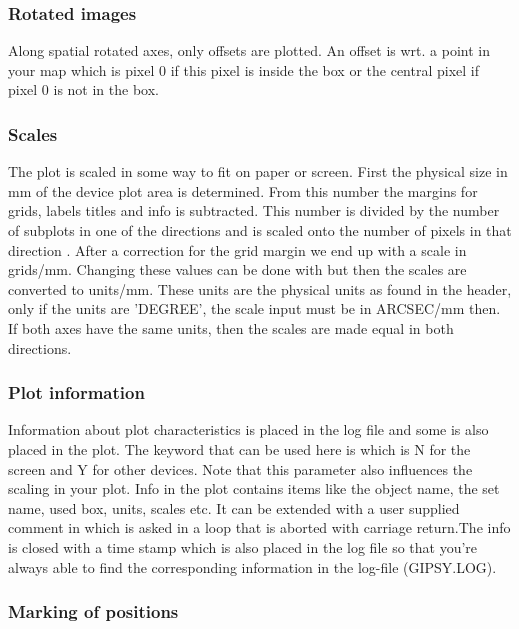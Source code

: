               
\subsubsection*{Rotated images}
              
Along spatial rotated axes, only offsets are plotted. An
offset is wrt. a point in your map which is pixel 0 if
this pixel is inside the box or the central pixel if 
pixel 0 is not in the box.

\subsubsection*{Scales}
              
The plot is scaled in some way to fit on paper or screen.
First the physical size in mm of the device plot area is
determined. From this number the margins for grids, labels
titles and info is subtracted. This number is divided by
the number of subplots in one of the directions and is 
scaled onto the number of pixels in that direction . 
After a correction for the grid margin we end up with a
scale in grids/mm. Changing these values can be done with
 but then the scales are converted to units/mm.
These units are the physical units as found in the header,
only if the units are 'DEGREE', the scale input must be in
ARCSEC/mm then. If both axes have the same units, then the
scales are made equal in both directions.
              
              
\subsubsection*{Plot information}
              
Information about plot characteristics is placed in the
log file and some is also placed in the plot. The keyword
that can be used here is  which is N for the
screen and Y for other devices. Note that this parameter
also influences the scaling in your plot. Info in the plot
contains items like the object name, the set name, used
box, units, scales etc. It can be extended with a user
supplied comment in  which is asked in a 
loop that
is aborted with carriage return.The info is closed with a
time stamp which is also placed in the log file so that
you're always able to find the corresponding information
in the log-file (GIPSY.LOG).

\subsubsection*{Marking of positions}
                                          
